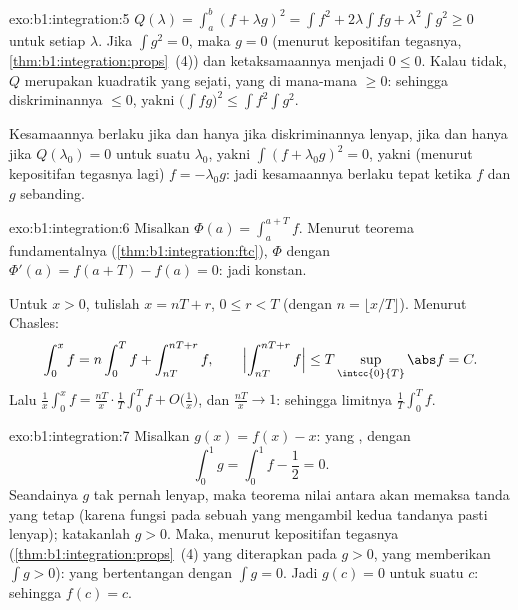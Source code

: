 \begin{solution}{exo:b1:integration:5}
$Q(\lambda) = \int_a^b (f + \lambda g)^2 = \int f^2 + 2\lambda \int
fg + \lambda^2 \int g^2 \geq 0$ untuk setiap $\lambda$. Jika $\int g^2 =
0$, maka $g = 0$ (menurut kepositifan tegasnya,
\cref{thm:b1:integration:props}~(4)) dan ketaksamaannya menjadi $0 \leq
0$. Kalau tidak, $Q$ merupakan kuadratik yang sejati, yang di mana-mana $\geq 0$: sehingga
diskriminannya $\leq 0$, yakni $\bigl(\int fg\bigr)^2 \leq \int
f^2 \int g^2$.

Kesamaannya berlaku jika dan hanya jika diskriminannya lenyap, jika dan hanya jika $Q(\lambda_0) = 0$ untuk
suatu $\lambda_0$, yakni $\int (f + \lambda_0 g)^2 = 0$, yakni (menurut kepositifan
tegasnya lagi) $f = -\lambda_0 g$: jadi kesamaannya berlaku tepat ketika
$f$ dan $g$ sebanding.
\end{solution}

\begin{solution}{exo:b1:integration:6}
Misalkan $\Phi(a) = \int_a^{a+T} f$. Menurut teorema fundamentalnya
(\cref{thm:b1:integration:ftc}), $\Phi$  dengan
$\Phi'(a) = f(a + T) - f(a) = 0$: jadi konstan.

Untuk $x > 0$, tulislah $x = nT + r$, $0 \leq r < T$ (dengan $n = \lfloor x/T
\rfloor$). Menurut Chasles:
\[
\int_0^x f = n \int_0^T f + \int_{nT}^{nT + r} f,
\qquad
\Bigl| \int_{nT}^{nT+r} f \Bigr| \leq T \sup_{\intcc{0}{T}} \abs f
= C .
\]
Lalu $\frac 1x \int_0^x f = \frac{nT}{x}\cdot\frac 1T \int_0^T f +
O\bigl(\frac 1x\bigr)$, dan $\frac{nT}{x} \to 1$: sehingga limitnya
$\frac1T \int_0^T f$.
\end{solution}

\begin{solution}{exo:b1:integration:7}
Misalkan $g(x) = f(x) - x$: yang , dengan
\[
\int_0^1 g = \int_0^1 f - \frac12 = 0 .
\]
Seandainya $g$ tak pernah lenyap, maka teorema nilai antara akan memaksa
tanda yang tetap (karena fungsi  pada sebuah  yang mengambil kedua tandanya
pasti lenyap); katakanlah $g > 0$. Maka, menurut kepositifan tegasnya
(\cref{thm:b1:integration:props}~(4) yang diterapkan pada $g > 0$, yang memberikan
$\int g > 0$): yang bertentangan dengan $\int g = 0$. Jadi $g(c) = 0$ untuk
suatu $c$: sehingga $f(c) = c$.
\end{solution}

